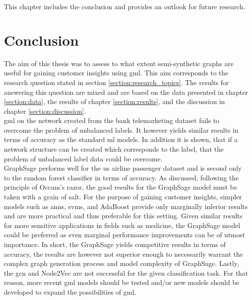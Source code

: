 
  This chapter includes the conclusion and provides an outlook for future
  research.

  \section{Conclusion}
  \label{section:conclusion}

  The aim of this thesis was to assess to what extent semi-synthetic graphs 
  are useful for gaining customer insights using \acs{gml}. This aim corresponds 
  to the research question stated in section \ref{section:research_topics}. The
  results for answering this question are mixed and are based on the data
  presented in chapter \ref{section:data}, the results of chapter
  \ref{section:results}, and the discussion in chapter \ref{section:discussion}.
  \\

  \noindent \acs{gml} on the network created from the bank telemarketing dataset 
  fails to overcome the problem of unbalanced labels. It however yields similar 
  results in terms of accuracy as the standard \acs{ml} models. In addition it 
  is shown, that if a network structure can be created which corresponds to the 
  label, that the problem of unbalanced label data could be overcome. \\

  \noindent GraphSage performs well for the \acs{us} airline passenger dataset 
  and is second only to the random forest classifier in terms of accuracy. As
  discussed, following the principle of Occam's razor, the good results for the
  GraphSage model must be taken with a grain of salt. For the purpose of
  gaining customer insights, simpler models such as \acsp{ann}, \acsp{svm}, and 
  AdaBoost provide only marginally inferior results and are more practical and 
  thus preferable for this setting. Given similar results for more sensitive 
  applications in fields such as medicine, the GraphSage model could be 
  preferred as even marginal performance improvements can be of utmost importance. 
  In short, the GraphSage yields competitive results in terms of accuracy, 
  the results are however not superior enough to necessarily warrant the complex 
  graph generation process and model complexity of GraphSage. Lastly, the 
  \acs{gcn} and Node2Vec are not successful for the given classification task. 
  For that reason, more recent \acs{gml} models should be tested and/or new 
  models should be developed to expand the possibilities of \acs{gml}.\\

